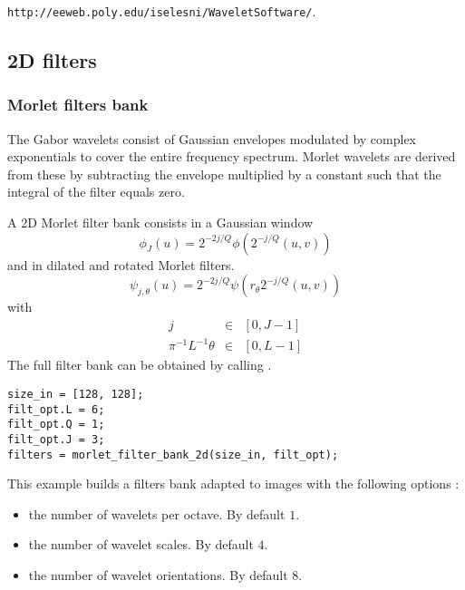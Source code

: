 \documentclass{article}
\begin{document}
\texttt{http://eeweb.poly.edu/iselesni/WaveletSoftware/}.



\subsection{2D filters}
\label{sec_filters_2d}
\subsubsection{Morlet filters bank}
The Gabor wavelets consist of Gaussian envelopes modulated by complex exponentials to cover the entire frequency spectrum. Morlet wavelets are derived from these by subtracting the envelope multiplied by a constant such that the integral of the filter equals zero. 

A 2D Morlet filter bank consists in a Gaussian window 
\begin{equation*}
\phi_J (u) =  2^{-2j/Q} \phi(2^{-j/Q} (u,v))
\end{equation*}
and in dilated and rotated Morlet filters.
\begin{equation*}
\psi_{j, \theta}(u) = 2^{-2j/Q} \psi(r_\theta 2^{-j/Q} (u,v)) 
\end{equation*}
with 
\begin{eqnarray*}
j & \in & [0,J-1] \\
\pi^{-1} L^{-1} \theta & \in & [0,L-1]
\end{eqnarray*}
The full filter bank can be obtained by calling 
. 
\begin{lstlisting}
size_in = [128, 128];
filt_opt.L = 6;
filt_opt.Q = 1;
filt_opt.J = 3;
filters = morlet_filter_bank_2d(size_in, filt_opt);
\end{lstlisting}
This example builds a filters bank adapted to  images with the following options :
\begin{itemize}
	\item {} the number of wavelets per octave. By default $1$.
	\item {}  the number of wavelet scales. By default $4$.
	\item {}  the number of wavelet orientations. By default $8$.
\end{itemize}	
\end{document}
